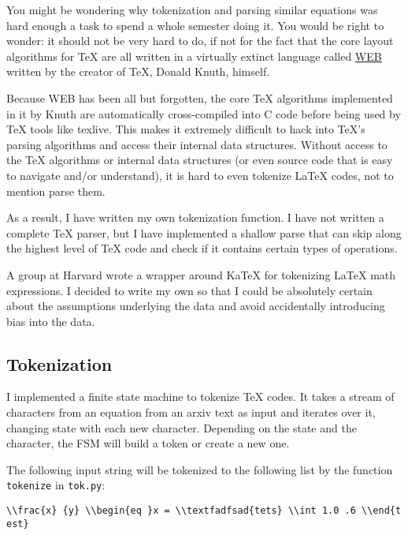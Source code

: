 \documentclass[]{article}
\begin{document}
You might be wondering why tokenization and parsing similar equations
was hard enough a task to spend a whole semester doing it. You would be
right to wonder: it should not be very hard to do, if not for the fact
that the core layout algorithms for TeX are all written in a virtually
extinct language called \href{https://en.wikipedia.org/wiki/WEB}{WEB}
written by the creator of TeX, Donald Knuth, himself.

Because WEB has been all but forgotten, the core TeX algorithms
implemented in it by Knuth are automatically cross-compiled into C code
before being used by TeX tools like texlive. This makes it extremely
difficult to hack into TeX's parsing algorithms and access their
internal data structures. Without access to the TeX algorithms or
internal data structures (or even source code that is easy to navigate
and/or understand), it is hard to even tokenize LaTeX codes, not to
mention parse them.

As a result, I have written my own tokenization function. I have not
written a complete TeX parser, but I have implemented a shallow parse
that can skip along the highest level of TeX code and check if it
contains certain types of operations.

A group at Harvard wrote a wrapper around KaTeX for tokenizing LaTeX
math expressions. I decided to write my own so that I could be
absolutely certain about the assumptions underlying the data and avoid
accidentally introducing bias into the data.

\hypertarget{tokenization}{%
\subsection{Tokenization}\label{tokenization}}

I implemented a finite state machine to tokenize TeX codes. It takes a
stream of characters from an equation from an arxiv text as input and
iterates over it, changing state with each new character. Depending on
the state and the character, the FSM will build a token or create a new
one.

The following input string will be tokenized to the following list by
the function \texttt{tokenize} in \texttt{tok.py}:

\texttt{\textquotesingle{}\textbackslash{}\textbackslash{}frac\{x\}\ \{y\}\ \textbackslash{}\textbackslash{}begin\{eq\ \}x\ =\ \textbackslash{}\textbackslash{}textfadfsad\{tets\}\ \textbackslash{}\textbackslash{}int\ 1.0\ .6\ \textbackslash{}\textbackslash{}end\{test\}\textquotesingle{}}
\end{document}
